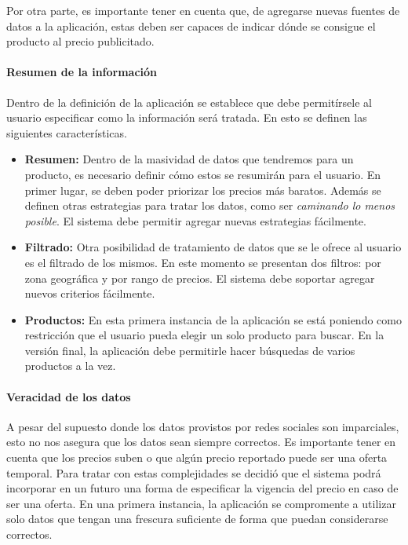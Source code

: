\documentclass[10pt, a4paper]{article}
\begin{document}
Por otra parte, es importante tener en cuenta que, de agregarse nuevas fuentes de datos a la aplicación, estas deben ser capaces de indicar dónde se consigue el producto al precio publicitado.

\paragraph{Resumen de la información}
Dentro de la definición de la aplicación se establece que debe permitírsele al usuario especificar como la información será tratada. En esto se definen las siguientes características.

\begin{itemize}
  \item \textbf{Resumen:} Dentro de la masividad de datos que tendremos para un producto, es necesario definir cómo estos se resumirán para el usuario. En primer lugar, se deben poder priorizar los precios más baratos. Además se definen otras estrategias para tratar los datos, como ser \emph{caminando lo menos posible}. El sistema debe permitir agregar nuevas estrategias fácilmente.
  \item \textbf{Filtrado:} Otra posibilidad de tratamiento de datos que se le ofrece al usuario es el filtrado de los mismos. En este momento se presentan dos filtros: por zona geográfica y por rango de precios. El sistema debe soportar agregar nuevos criterios fácilmente.
  \item \textbf{Productos:} En esta primera instancia de la aplicación se está poniendo como restricción que el usuario pueda elegir un solo producto para buscar. En la versión final, la aplicación debe permitirle hacer búsquedas de varios productos a la vez.
\end{itemize}

\paragraph{Veracidad de los datos} A pesar del supuesto donde los datos provistos por redes sociales son imparciales, esto no nos asegura que los datos sean siempre correctos. Es importante tener en cuenta que los precios suben o que algún precio reportado puede ser una oferta temporal. Para tratar con estas complejidades se decidió que el sistema podrá incorporar en un futuro una forma de especificar la vigencia del precio en caso de ser una oferta. En una primera instancia, la aplicación se compromente a utilizar solo datos que tengan una frescura suficiente de forma que puedan considerarse correctos.
\end{document}
